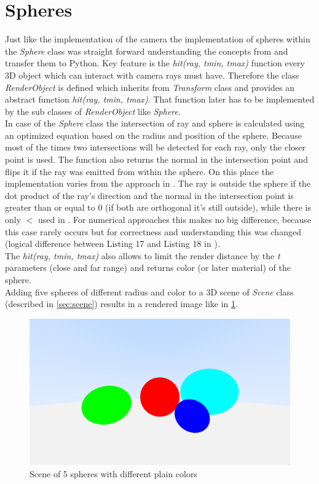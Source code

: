 \documentclass[]{article}
\begin{document}
	\section{Spheres}
	Just like the implementation of the camera the implementation of spheres within the \emph{Sphere} class was straight forward understanding the concepts from \cite{Shirley2020RTW1} and transfer them to Python. Key feature is the \emph{hit(ray, t\textunderscore min, t\textunderscore max)} function every 3D object which can interact with camera rays must have. Therefore the class \emph{RenderObject} is defined which inherits from \emph{Transform} class and provides an abstract function \emph{hit(ray, t\textunderscore min, t\textunderscore max)}. That function later has to be implemented by the sub classes of \emph{RenderObject} like \emph{Sphere}.
	\\
	In case of the \emph{Sphere} class the intersection of ray and sphere is calculated using an optimized equation based on the radius and position of the sphere. Because most of the times two intersections will be detected for each ray, only the closer point is used. The function also returns the normal in the intersection point and flips it if the ray was emitted from within the sphere. On this place the implementation varies from the approach in \cite{Shirley2020RTW1}. The ray is outside the sphere if the dot product of the ray’s direction and the normal in the intersection point is greater than or equal to 0 (if both are orthogonal it’s still outside), while there is only $<$ used in \cite{Shirley2020RTW1}. For numerical approaches this makes no big difference, because this case rarely occurs but for correctness and understanding this was changed (logical difference between Listing 17 and Listing 18 in \cite{Shirley2020RTW1}).
	\\
	The \emph{hit(ray, t\textunderscore min, t\textunderscore max)} also allows to limit the render distance by the \emph{t} parameters (close and far range) and returns color (or later material) of the sphere.
	\\
	Adding five spheres of different radius and color to a 3D scene of \emph{Scene} class (described in \cref{sec:scene}) results in a rendered image like in \cref{fig:image3}.
	
	\begin{figure}[h]
		\centering
		\includegraphics[width=0.75\linewidth]{image3}
		\caption{Scene of 5 spheres with different plain colors}
		\label{fig:image3}
	\end{figure}
\end{document}
